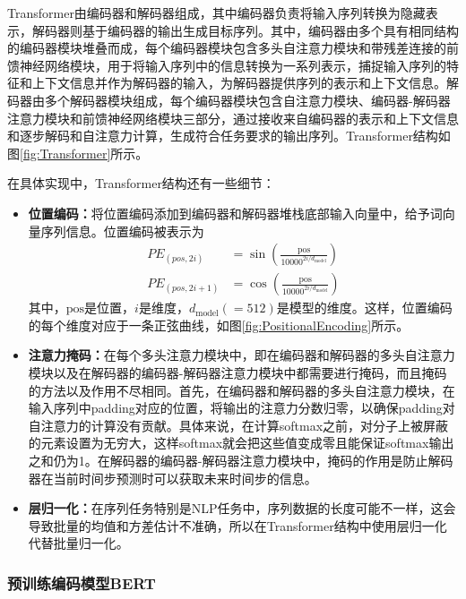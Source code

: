 Transformer由编码器和解码器组成，其中编码器负责将输入序列转换为隐藏表示，解码器则基于编码器的输出生成目标序列。其中，编码器由多个具有相同结构的编码器模块堆叠而成，每个编码器模块包含多头自注意力模块和带残差连接的前馈神经网络模块，用于将输入序列中的信息转换为一系列表示，捕捉输入序列的特征和上下文信息并作为解码器的输入，为解码器提供序列的表示和上下文信息。解码器由多个解码器模块组成，每个编码器模块包含自注意力模块、编码器-解码器注意力模块和前馈神经网络模块三部分，通过接收来自编码器的表示和上下文信息和逐步解码和自注意力计算，生成符合任务要求的输出序列。Transformer结构如图\ref{fig:Transformer}所示。



在具体实现中，Transformer结构还有一些细节：

\begin{itemize}
	\item \textbf{位置编码：}将位置编码添加到编码器和解码器堆栈底部输入向量中，给予词向量序列信息。位置编码被表示为
	$$
	\begin{aligned}
		P E_{(p o s, 2 i)} & =\sin \left(\frac{\text { pos }}{10000^{2 i / d_{\mathrm{model}}}}\right) \\
		P E_{(p o s, 2 i+1)} & =\cos \left(\frac{\text { pos } }{ 10000^{2 i / d_{\mathrm{model}}}}\right)
	\end{aligned}
	$$
	其中，$\text{pos}$是位置，$i$是维度，$d_\text{model}(=512)$是模型的维度。这样，位置编码的每个维度对应于一条正弦曲线，如图\ref{fig:PositionalEncoding}所示。
	
	\item \textbf{注意力掩码：}在每个多头注意力模块中，即在编码器和解码器的多头自注意力模块以及在解码器的编码器-解码器注意力模块中都需要进行掩码，而且掩码的方法以及作用不尽相同。首先，在编码器和解码器的多头自注意力模块，在输入序列中padding对应的位置，将输出的注意力分数归零，以确保padding对自注意力的计算没有贡献。具体来说，在计算softmax之前，对分子上被屏蔽的元素设置为无穷大，这样softmax就会把这些值变成零且能保证softmax输出之和仍为1。在解码器的编码器-解码器注意力模块中，掩码的作用是防止解码器在当前时间步预测时可以获取未来时间步的信息。
	\item \textbf{层归一化：}在序列任务特别是NLP任务中，序列数据的长度可能不一样，这会导致批量的均值和方差估计不准确，所以在Transformer结构中使用层归一化代替批量归一化。
\end{itemize}

\subsubsection{预训练编码模型BERT}

